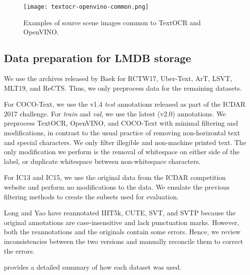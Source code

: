 \begin{figure*}[htbp]
  \centering
  \texttt{[image: textocr-openvino-common.png]}
   \caption{Examples of source scene images common to TextOCR and OpenVINO.}
   \label{fig:textocr-openvino-overlap}
\end{figure*}

\subsection{Data preparation for LMDB storage}

We use the archives released by Baek \etal \cite{Baek_2021_CVPR} for RCTW17, Uber-Text, ArT, LSVT, MLT19, and ReCTS. Thus, we only preprocess data for the remaining datasets.

For COCO-Text, we use the v1.4 \textit{test} annotations released as part of the ICDAR 2017 challenge. For \textit{train} and \textit{val}, we use the latest (v2.0) annotations. We preprocess TextOCR, OpenVINO, and COCO-Text with minimal filtering and modifications, in contrast to the usual practice of removing non-horizontal text and special characters. We only filter illegible and non-machine printed text. The only modification we perform is the removal of whitespace on either side of the label, or duplicate whitespace between non-whitespace characters.

For IC13 and IC15, we use the original data from the ICDAR competition website and perform no modifications to the data. We emulate the previous filtering methods \cite{wang2011end,cheng2017focusing} to create the subsets used for evaluation.

Long and Yao \cite{long2020unreal} have reannotated IIIT5k, CUTE, SVT, and SVTP because the original annotations are case-insensitive and lack punctuation marks. However, both the reannotations and the originals contain some errors. Hence, we review inconsistencies between the two versions and manually reconcile them to correct the errors.

 provides a detailed summary of how each dataset was used.

